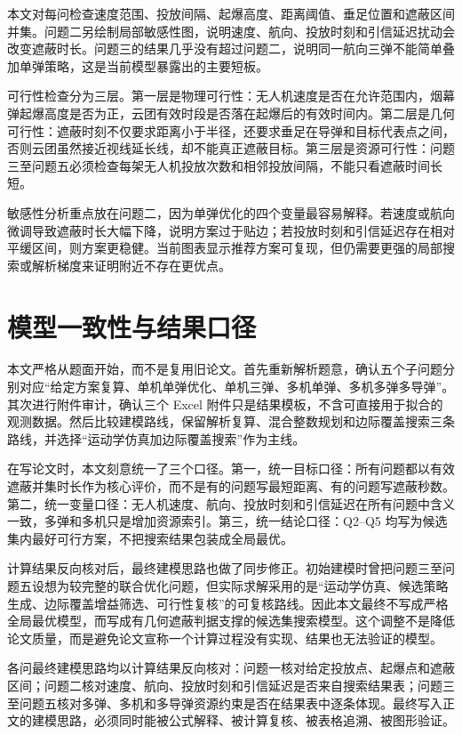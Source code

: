 \documentclass[UTF8,12pt,a4paper]{ctexart}
\begin{document}
本文对每问检查速度范围、投放间隔、起爆高度、距离阈值、垂足位置和遮蔽区间并集。问题二另绘制局部敏感性图，说明速度、航向、投放时刻和引信延迟扰动会改变遮蔽时长。问题三的结果几乎没有超过问题二，说明同一航向三弹不能简单叠加单弹策略，这是当前模型暴露出的主要短板。

可行性检查分为三层。第一层是物理可行性：无人机速度是否在允许范围内，烟幕弹起爆高度是否为正，云团有效时段是否落在起爆后的有效时间内。第二层是几何可行性：遮蔽时刻不仅要求距离小于半径，还要求垂足在导弹和目标代表点之间，否则云团虽然接近视线延长线，却不能真正遮蔽目标。第三层是资源可行性：问题三至问题五必须检查每架无人机投放次数和相邻投放间隔，不能只看遮蔽时间长短。

敏感性分析重点放在问题二，因为单弹优化的四个变量最容易解释。若速度或航向微调导致遮蔽时长大幅下降，说明方案过于贴边；若投放时刻和引信延迟存在相对平缓区间，则方案更稳健。当前图表显示推荐方案可复现，但仍需要更强的局部搜索或解析梯度来证明附近不存在更优点。

\section{模型一致性与结果口径}

本文严格从题面开始，而不是复用旧论文。首先重新解析题意，确认五个子问题分别对应“给定方案复算、单机单弹优化、单机三弹、多机单弹、多机多弹多导弹”。其次进行附件审计，确认三个 Excel 附件只是结果模板，不含可直接用于拟合的观测数据。然后比较建模路线，保留解析复算、混合整数规划和边际覆盖搜索三条路线，并选择“运动学仿真加边际覆盖搜索”作为主线。

在写论文时，本文刻意统一了三个口径。第一，统一目标口径：所有问题都以有效遮蔽并集时长作为核心评价，而不是有的问题写最短距离、有的问题写遮蔽秒数。第二，统一变量口径：无人机速度、航向、投放时刻和引信延迟在所有问题中含义一致，多弹和多机只是增加资源索引。第三，统一结论口径：Q2--Q5 均写为候选集内最好可行方案，不把搜索结果包装成全局最优。

计算结果反向核对后，最终建模思路也做了同步修正。初始建模时曾把问题三至问题五设想为较完整的联合优化问题，但实际求解采用的是“运动学仿真、候选策略生成、边际覆盖增益筛选、可行性复核”的可复核路线。因此本文最终不写成严格全局最优模型，而写成有几何遮蔽判据支撑的候选集搜索模型。这个调整不是降低论文质量，而是避免论文宣称一个计算过程没有实现、结果也无法验证的模型。

各问最终建模思路均以计算结果反向核对：问题一核对给定投放点、起爆点和遮蔽区间；问题二核对速度、航向、投放时刻和引信延迟是否来自搜索结果表；问题三至问题五核对多弹、多机和多导弹资源约束是否在结果表中逐条体现。最终写入正文的建模思路，必须同时能被公式解释、被计算复核、被表格追溯、被图形验证。
\end{document}
